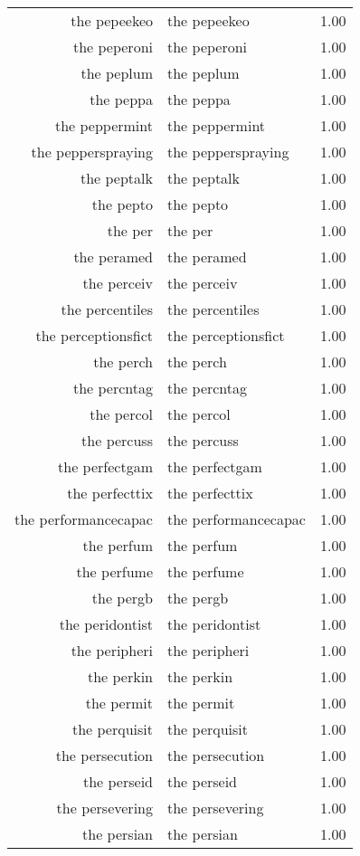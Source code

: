 \begin{table}[ht]
\begin{tabular}{rlr}
  the pepeekeo & the pepeekeo & 1.00 \\ 
  the peperoni & the peperoni & 1.00 \\ 
  the peplum & the peplum & 1.00 \\ 
  the peppa & the peppa & 1.00 \\ 
  the peppermint & the peppermint & 1.00 \\ 
  the pepperspraying & the pepperspraying & 1.00 \\ 
  the peptalk & the peptalk & 1.00 \\ 
  the pepto & the pepto & 1.00 \\ 
  the per & the per & 1.00 \\ 
  the peramed & the peramed & 1.00 \\ 
  the perceiv & the perceiv & 1.00 \\ 
  the percentiles & the percentiles & 1.00 \\ 
  the perceptionsfict & the perceptionsfict & 1.00 \\ 
  the perch & the perch & 1.00 \\ 
  the percntag & the percntag & 1.00 \\ 
  the percol & the percol & 1.00 \\ 
  the percuss & the percuss & 1.00 \\ 
  the perfectgam & the perfectgam & 1.00 \\ 
  the perfecttix & the perfecttix & 1.00 \\ 
  the performancecapac & the performancecapac & 1.00 \\ 
  the perfum & the perfum & 1.00 \\ 
  the perfume & the perfume & 1.00 \\ 
  the pergb & the pergb & 1.00 \\ 
  the peridontist & the peridontist & 1.00 \\ 
  the peripheri & the peripheri & 1.00 \\ 
  the perkin & the perkin & 1.00 \\ 
  the permit & the permit & 1.00 \\ 
  the perquisit & the perquisit & 1.00 \\ 
  the persecution & the persecution & 1.00 \\ 
  the perseid & the perseid & 1.00 \\ 
  the persevering & the persevering & 1.00 \\ 
  the persian & the persian & 1.00 \\ 

\end{tabular}
\end{table}
